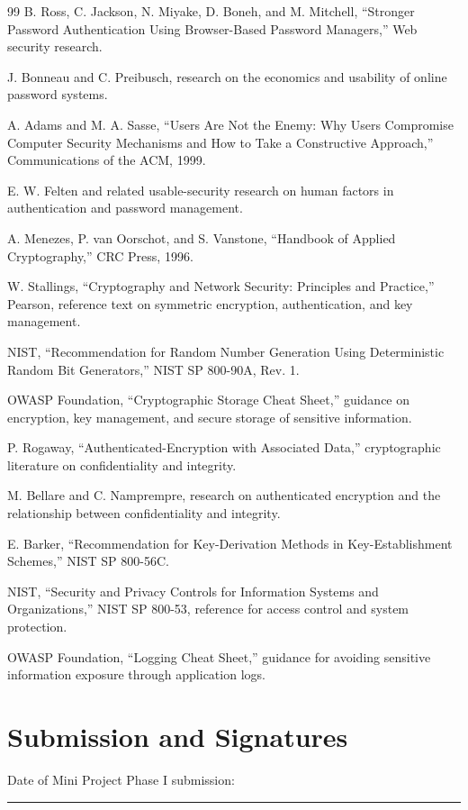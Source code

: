 \documentclass[12pt,a4paper,oneside]{report}
\begin{document}
\begin{thebibliography}{99}
 B. Ross, C. Jackson, N. Miyake, D. Boneh, and M. Mitchell, “Stronger Password Authentication Using Browser-Based Password Managers,” Web security research.

 J. Bonneau and C. Preibusch, research on the economics and usability of online password systems.

 A. Adams and M. A. Sasse, “Users Are Not the Enemy: Why Users Compromise Computer Security Mechanisms and How to Take a Constructive Approach,” Communications of the ACM, 1999.

 E. W. Felten and related usable-security research on human factors in authentication and password management.

 A. Menezes, P. van Oorschot, and S. Vanstone, “Handbook of Applied Cryptography,” CRC Press, 1996.

 W. Stallings, “Cryptography and Network Security: Principles and Practice,” Pearson, reference text on symmetric encryption, authentication, and key management.

 NIST, “Recommendation for Random Number Generation Using Deterministic Random Bit Generators,” NIST SP 800-90A, Rev. 1.

 OWASP Foundation, “Cryptographic Storage Cheat Sheet,” guidance on encryption, key management, and secure storage of sensitive information.

 P. Rogaway, “Authenticated-Encryption with Associated Data,” cryptographic literature on confidentiality and integrity.

 M. Bellare and C. Namprempre, research on authenticated encryption and the relationship between confidentiality and integrity.

 E. Barker, “Recommendation for Key-Derivation Methods in Key-Establishment Schemes,” NIST SP 800-56C.

 NIST, “Security and Privacy Controls for Information Systems and Organizations,” NIST SP 800-53, reference for access control and system protection.

 OWASP Foundation, “Logging Cheat Sheet,” guidance for avoiding sensitive information exposure through application logs.

\end{thebibliography}


\FloatBarrier
\section*{Submission and Signatures}
Date of Mini Project Phase I submission: \rule{55mm}{0.4pt}
\end{document}
